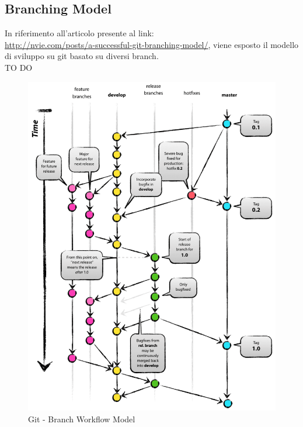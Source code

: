 	\subsection{Branching Model} %
	\label{sub:branching_model}
	In riferimento all'articolo presente al link: \\
	\url{http://nvie.com/posts/a-successful-git-branching-model/}, viene esposto il modello di sviluppo su git basato su diversi branch. \\
	TO DO
	\begin{figure}[htbp]
		\centering
		\includegraphics[scale=0.4]{images/git_branch_workflow.png}
		\caption{Git - Branch Workflow Model}
		\label{fig:git_branch_workflow_model}
	\end{figure}


\newpage \clearpage
